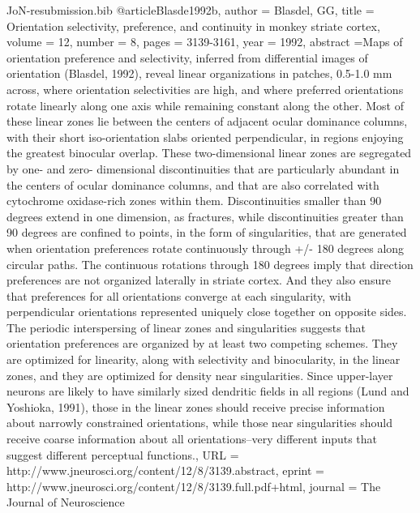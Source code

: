 \documentclass{article}
\begin{document}
\begin{filecontents}{JoN-resubmission.bib}
@article{Blasde1992b,
author = {Blasdel, GG},
title = {Orientation selectivity, preference, and continuity in monkey striate cortex},
volume = {12},
number = {8},
pages = {3139-3161},
year = {1992},
abstract ={Maps of orientation preference and selectivity, inferred from differential images of orientation (Blasdel, 1992), reveal linear organizations in patches, 0.5-1.0 mm across, where orientation selectivities are high, and where preferred orientations rotate linearly along one axis while remaining constant along the other. Most of these linear zones lie between the centers of adjacent ocular dominance columns, with their short iso-orientation slabs oriented perpendicular, in regions enjoying the greatest binocular overlap. These two-dimensional linear zones are segregated by one- and zero- dimensional discontinuities that are particularly abundant in the centers of ocular dominance columns, and that are also correlated with cytochrome oxidase-rich zones within them. Discontinuities smaller than 90 degrees extend in one dimension, as fractures, while discontinuities greater than 90 degrees are confined to points, in the form of singularities, that are generated when orientation preferences rotate continuously through +/- 180 degrees along circular paths. The continuous rotations through 180 degrees imply that direction preferences are not organized laterally in striate cortex. And they also ensure that preferences for all orientations converge at each singularity, with perpendicular orientations represented uniquely close together on opposite sides. The periodic interspersing of linear zones and singularities suggests that orientation preferences are organized by at least two competing schemes. They are optimized for linearity, along with selectivity and binocularity, in the linear zones, and they are optimized for density near singularities. Since upper-layer neurons are likely to have similarly sized dendritic fields in all regions (Lund and Yoshioka, 1991), those in the linear zones should receive precise information about narrowly constrained orientations, while those near singularities should receive coarse information about all orientations--very different inputs that suggest different perceptual functions.},
URL = {http://www.jneurosci.org/content/12/8/3139.abstract},
eprint = {http://www.jneurosci.org/content/12/8/3139.full.pdf+html},
journal = {The Journal of Neuroscience}
}


\end{filecontents}
\end{document}
